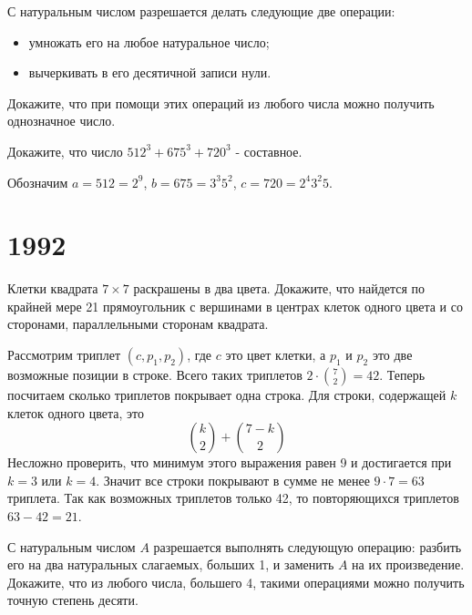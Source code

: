 \documentclass[11pt, a4paper]{common/document_template}
\begin{document}
\begin{exercise}[53]
С натуральным числом разрешается делать следующие две операции:
\begin{itemize}
\item умножать его на любое натуральное число;
\item вычеркивать в его десятичной записи нули.
\end{itemize}
Докажите, что при помощи этих операций из любого числа можно получить однозначное число.
\end{exercise}

\begin{exercise}[56]
Докажите, что число $512^{3} + 675^{3} + 720^{3}$ - составное.
\end{exercise}

\begin{Solution}
Обозначим $a = 512 = 2^{9}$, $b = 675 = 3^{3}5^{2}$, $c = 720 = 2^{4}3^{2}5$.
\end{Solution}



\chapter{1992}

\begin{exercise}[19]
Клетки квадрата $7 \times 7$ раскрашены в два цвета. Докажите, что найдется по крайней мере 21 прямоугольник с вершинами в центрах клеток одного цвета и со сторонами, параллельными сторонам квадрата.
\end{exercise}

\begin{Solution}
Рассмотрим триплет $(c, p_{1}, p_{2})$, где $c$ это цвет клетки, а $p_{1}$ и $p_{2}$ это две возможные позиции в строке. Всего таких триплетов $2 \cdot \binom{7}{2} = 42$. Теперь посчитаем сколько триплетов покрывает одна строка. Для строки, содержащей $k$ клеток одного цвета, это
$$
\binom{k}{2} + \binom{7 - k}{2}
$$  
Несложно проверить, что минимум этого выражения равен 9 и достигается при $k = 3$ или $k = 4$. Значит все строки покрывают в сумме не менее $9 \cdot 7 = 63$ триплета. Так как возможных триплетов только 42, то повторяющихся триплетов $63 - 42 = 21$.
\end{Solution}

\begin{exercise}
С натуральным числом $A$ разрешается выполнять следующую операцию: разбить его на два натуральных слагаемых, больших 1, и заменить $A$ на их произведение. Докажите, что из любого числа, большего 4, такими операциями можно получить точную степень десяти.
\end{exercise}
\end{document}
